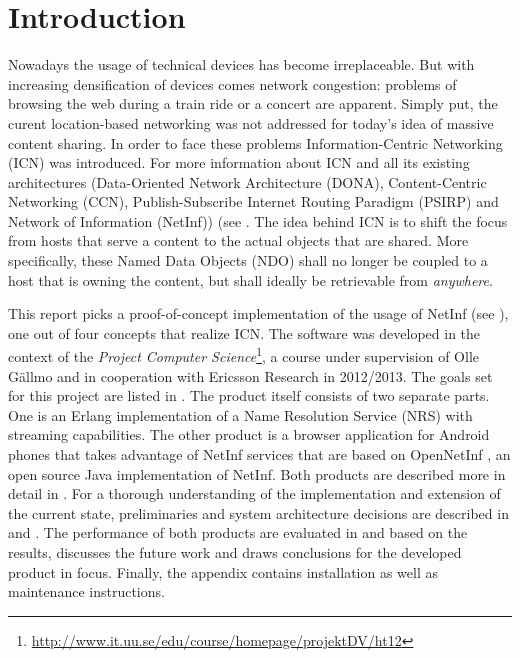 \chapter{Introduction}

Nowadays the usage of technical devices has become irreplaceable. But with increasing
densification of devices comes network congestion: problems of
browsing the web during a train ride or a concert are apparent. Simply put, the curent
location-based networking was not addressed for today's idea of massive content sharing. 
In order to face these problems Information-Centric Networking (ICN) was introduced. For
more information about ICN and all its existing architectures (Data-Oriented Network Architecture (DONA),
Content-Centric Networking (CCN), Publish-Subscribe Internet Routing Paradigm (PSIRP) and Network of Information (NetInf)) 
(see \cite{netinf}.
The idea behind ICN is to shift the focus from hosts that serve a content to the actual objects that
are shared. More specifically, these Named Data Objects (NDO) shall no longer be coupled
to a host that is owning the content, but shall ideally be retrievable from \textit{anywhere}.

This report picks a proof-of-concept implementation of the usage of NetInf
(see ), one out of four concepts that realize ICN. The software was
developed in the context of the 
\textit{Project Computer Science}\footnote{\url{http://www.it.uu.se/edu/course/homepage/projektDV/ht12}},
a course under supervision of Olle G\"{a}llmo and in cooperation with Ericsson Research \cite{ericsson}
in 2012/2013. The goals set for this project are listed in . 
The product itself consists of two separate parts. One is an Erlang \cite{erlang} implementation of a Name Resolution Service (NRS) with streaming capabilities.
The other product is a browser application for Android phones that takes advantage of NetInf services that
are based on OpenNetInf \cite{opennetinf}, an open source Java implementation of NetInf. 
Both products are described more in detail in . For a thorough understanding
of the implementation and extension of the current state, preliminaries and system architecture decisions are 
described in  and . 
The performance of both products are evaluated in  and based on the results,
 discusses the future work and draws conclusions for the developed product
in focus. Finally, the appendix contains installation as well as maintenance instructions.